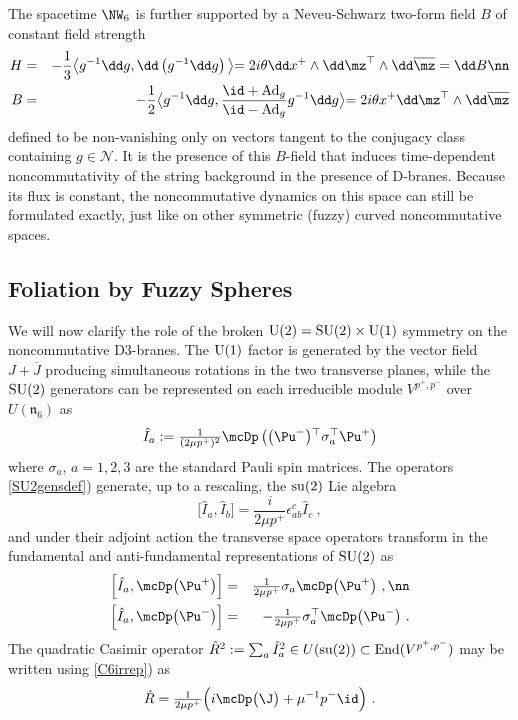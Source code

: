 The spacetime $\NW_6$ is further supported by a Neveu-Schwarz two-form field $B$
of constant field strength
\begin{eqnarray}
  \label{NS2formBrink}
  H&=&-\frac13  \bigl\langle g^{-1} \dd g , \dd
  \left(g^{-1} \dd g\right)\bigl\rangle
  = 2 i \theta \dd x^+\wedge\dd\mz^\top\wedge\dd\overline{\mz}
  = \dd B   \nn\\
  B&=&-\frac12  \bigl\langle g^{-1} \dd g , 
  \frac{\id+{\rm Ad}_g}{\id-{\rm Ad}_g} g^{-1} \dd g\bigl\rangle = 
  2 i \theta x^+ \dd\mz^\top\wedge\dd\overline{\mz}  
\end{eqnarray}
defined to be non-vanishing only on vectors tangent to the conjugacy class
containing $g\in\mathcal{N}$. It is the presence of this $B$-field that induces
time-dependent noncommutativity of the string background in the presence of
D-branes. Because its flux is constant, the noncommutative dynamics on this
space can still be formulated exactly, just like on other symmetric (fuzzy)
curved noncommutative spaces.

\subsection{Foliation by Fuzzy Spheres\label{D3Fuzzy}}

We will now clarify the role of the broken ${\rm U}(2)={\rm
  SU}(2)\times{\rm U}(1)$ symmetry on the noncommutative D3-branes. The ${\rm
U}(1)$ factor is generated by the vector
field $J+\overline{J}$ producing simultaneous rotations in the two
transverse planes, while the ${\rm SU}(2)$ generators can be
represented on each irreducible module $V^{p^+,p^-}$ over
$U(\mathfrak{n}_6)$ as
\begin{equation}
\hat I_a:=\mbox{$\frac1{(2\mu p^+)^2}$} 
\mcDp\left(\bigl( \Pu^-\bigr){}^\top 
\sigma_a^\top \Pu^+\right)
\label{SU2gensdef}\end{equation}
where $\sigma_a$, $a=1,2,3$ are the standard Pauli spin matrices. The
operators \eqref{SU2gensdef}) generate, up to a rescaling, the ${\rm
  su}(2)$ Lie algebra
\begin{equation}
\bigl[\hat I_a , \hat I_b\bigr]=
\mbox{$\frac i{2\mu p^+}$} \epsilon_{ab}^{   c} \hat I_c \ ,
\label{su2liealg}\end{equation}
and under their adjoint action the transverse space operators
transform in the fundamental and anti-fundamental representations of
${\rm SU}(2)$ as
\begin{eqnarray}
\left[\hat I_a , \mcDp\bigl( \Pu^+\bigr)
\right]&=&\mbox{$\frac1{2\mu p^+}$} 
\sigma_a \mcDp\bigl( \Pu^+\bigr) \ , \nn\\
\left[\hat I_a , \mcDp\bigl( \Pu^-\bigr)
\right]&=&-\mbox{$\frac1{2\mu p^+}$} 
\sigma_a^\top \mcDp\bigl( \Pu^-\bigr) \ .
\label{Pfundreps}\end{eqnarray}
The quadratic Casimir operator $\hat R^2:=\sum_a\hat I_a^2\in U({\rm
  su}(2))\subset{\rm End}(V^{p^+,p^-})$ may be written using
\eqref{C6irrep}) as
\begin{equation}
\hat R=\mbox{$\frac1{2\mu p^+}$} \Bigl( i\mcDp\bigl(\J \bigr)
+\mu^{-1} p^- \id\Bigr) \ .
\label{su2quadCas}\end{equation}


